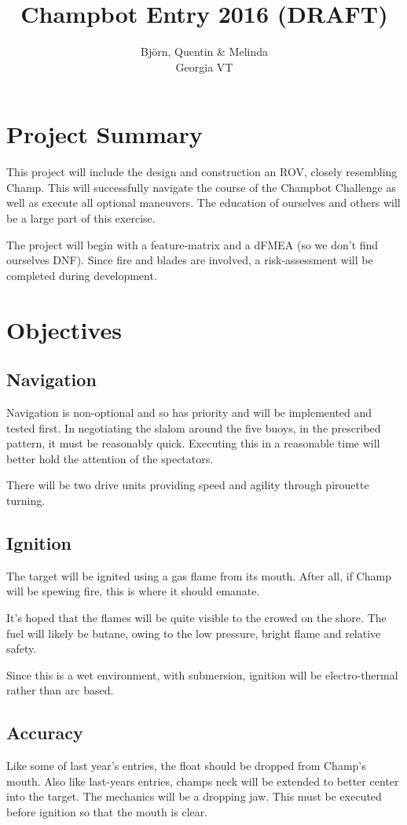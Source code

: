\documentclass[]{article}
\title{Champbot Entry 2016 (DRAFT)}
\author{Bj{\"o}rn, Quentin \& Melinda\\Georgia VT}
\begin{document}
\maketitle

\section{Project Summary}
This project will include the design and construction an ROV, closely resembling Champ.
This will successfully navigate the course of the Champbot Challenge as well as execute all optional maneuvers.
The education of ourselves and others will be a large part of this exercise.  

The project will begin with a feature-matrix and a dFMEA (so we don't find ourselves DNF).
Since fire and blades are involved, a risk-assessment will be completed during development.

\section{Objectives}
\subsection{Navigation}
Navigation is non-optional and so has priority and will be implemented and tested first.
In negotiating the slalom around the five buoys, in the prescribed pattern, it must be reasonably quick.
Executing this in a reasonable time will better hold the attention of the spectators.

There will be two drive units providing speed and agility through pirouette turning.


\subsection{Ignition}
The target will be ignited using a gas flame from its mouth.
After all, if Champ will be spewing fire, this is where it should emanate.

It's hoped that the flames will be quite visible to the crowed on the shore.
The fuel will likely be butane, owing to the low pressure, bright flame and relative safety.

Since this is a wet environment, with submersion, ignition will be electro-thermal rather than arc based.

\subsection{Accuracy}
Like some of last year's entries, the float should be dropped from Champ's mouth.
Also like last-years entries, champs neck will be extended to better center into the target.
The mechanics will be a dropping jaw. This must be executed before ignition so that the mouth is clear. 
\end{document}
